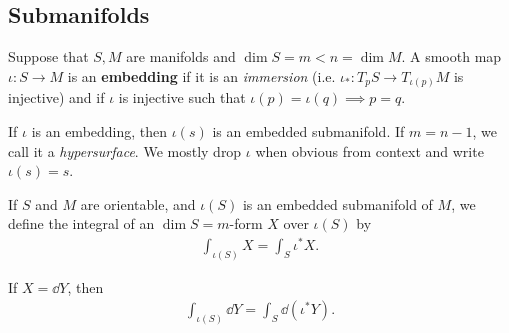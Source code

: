 \subsection{Submanifolds}
\vspace{0.5cm}
\begin{definition}
    Suppose that $S,M$ are manifolds and $\dim S = m < n = \dim M$. A smooth map $\iota : S \to M$ is an \textbf{embedding} if it is an \textit{immersion} (i.e. $\iota_{*} : T_p S \to T_{\iota(p)}M$ is injective) and if $\iota$ is injective such that $\iota \left( p \right) = \iota \left( q \right) \implies p = q$.
\end{definition}

If $\iota$ is an embedding, then $\iota \left( s \right) $ is an embedded submanifold. If $m = n - 1$, we call it a \textit{hypersurface}. We mostly drop $\iota$ when obvious from context and write $\iota \left( s \right) = s$.

If $S$ and $M$ are orientable, and $\iota \left( S \right) $ is an embedded submanifold of $M$, we define the integral of an $\dim S = m$-form $X$ over $\iota \left( S \right) $ by
\begin{align}
    \int_{\iota \left( S \right) } X = \int_S \iota^{*} X
.\end{align}

\begin{note}
    If $X = \dd{Y}$, then
    \begin{align}
        \int_{\iota \left( S \right) } \dd{Y} = \int_S \dd{\left( \iota^{*} Y \right) }
    .\end{align}
\end{note}


